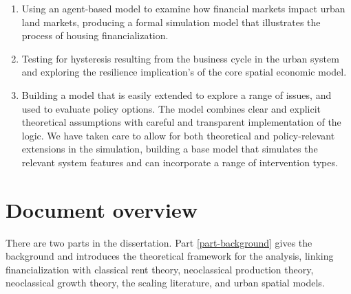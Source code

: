 \begin{enumerate}
    \item Using an agent-based model to examine how financial markets impact urban \glspl{land market},
producing a formal simulation model that illustrates the process of housing financialization. 

    \item Testing for \gls{hysteresis} resulting from the business cycle in the urban system and exploring the \gls{resilience} implication's of the core spatial economic model.

    \item Building a model that is easily extended to explore a range of issues, and used to evaluate policy options. 
The model combines clear and explicit theoretical assumptions with careful and transparent implementation of the logic. %
We have taken care to allow for  both theoretical and policy-relevant extensions in the simulation,  building a base model that 
simulates the relevant system features and can incorporate a range of intervention types. %
\end{enumerate}

\section{Document overview}

There are two parts in the dissertation. 
Part \ref{part-background} gives the background and introduces the theoretical framework for the analysis, linking financialization with classical rent theory, neoclassical production theory, neoclassical growth theory, the scaling literature, and urban spatial models. 

